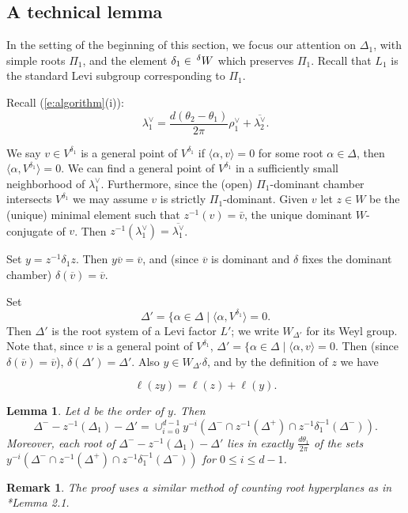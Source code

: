 \documentclass[10pt,leqno]{article}
\newtheorem{lemma}[equation]{Lemma}
\newtheorem{remark}[equation]{Remark}
{\theorembodyfont{\rmfamily}
\newtheorem{theoremplain}[equation]{Theorem}
\newtheorem{remarkplain}[equation]{Remark}
\newtheorem{editorialremarkplain}[equation]{Editorial Remark}
\newtheorem{exampleplain}[equation]{Example}
\newtheorem{corollaryplain}[equation]{Corollary}
}
\renewcommand{\a}{\mathfrak a}
\newcommand{\ch}[1]{#1^\vee}
\newcommand\inv{^{-1}}
\newcommand{\Wext}{\negthinspace\negthinspace\phantom{a}^\delta W}
\def\le{\leqslant}
\def\a{\alpha}
\def\d{\delta}
\def\th{\theta}
\def\l{\lambda}
\def\i{^{-1}}
\begin{document}

\subsection{A technical lemma}
\label{technical}

In the setting of the beginning of this section, we focus
our attention on $\Delta_1$, with simple roots $\Pi_1$,  and the element $\delta_1\in \Wext$
which preserves $\Pi_1$.
Recall that $L_1$ is the standard Levi subgroup corresponding to $\Pi_1$.

Recall (\ref{e:algorithm}(i)):
$$
\ch\l_1=\frac{d(\th_2-\th_1)}{2 \pi}
\ch\rho_1+\overline{\ch\l_2}.
$$

We say $v\in V^{\delta_1}$ is a general point of $V^{\delta_1}$ if $\langle\a, v\rangle=0$ for some
root $\a \in \Delta$, then $\langle\a, V^{\d_1}\rangle=0$.  We can
find a general point of $V^{\delta_1}$ in a sufficiently small
neighborhood of $\ch\l_{1}$.  Furthermore, since the (open)
$\Pi_1$-dominant chamber intersects $V^{\delta_1}$ we may assume $v$
is strictly $\Pi_1$-dominant.
Given $v$ let  $z \in W$ be the (unique) minimal element such
that $z\i(v) = \bar v$, the unique dominant $W$-conjugate of $v$.
Then $z\inv(\ch\l_{1})=\overline{\ch\l_{1}}$.

Set $y=z\inv\delta_1z$.  Then $y\overline v=\overline v$, and
(since $\overline v$ is dominant and $\delta$ fixes the dominant
chamber) $\delta(\overline v)=\overline v$.

Set
$$
\Delta'=\{\alpha\in\Delta\mid \langle\alpha,V^{\delta_1}\rangle=0.
$$
Then $\Delta'$ is the root system of a Levi factor $L'$; we write $W_{\Delta'}$ for its Weyl group.
Note that, since $v$ is a general point of $V^{\delta_1}$,  $\Delta'=\{\alpha\in\Delta\mid \langle\alpha,v\rangle=0$.
Then  (since $\delta(\overline v)=\overline v$), $\delta(\Delta')=\Delta'$. Also $y\in W_{\Delta'}\delta$,
and by the definition of $z$ we have

\begin{equation}
\label{e:lengthsadd}
\ell(zy)=\ell(z)+\ell(y).
\end{equation}

\begin{lemma} \label{tech}
Let $d$ be the order of $y$. Then
$$\Delta^- - z \i(\Delta_{1})-\Delta' = \cup_{i=0}^{d-1} y^{-i}(\Delta^- \cap z \i(\Delta^+) \cap z \i \d_1 \i(\Delta^-)).$$
Moreover, each root of $\Delta^- - z \i(\Delta_{1})-\Delta'$ lies in exactly $\frac{d \th_1} {2\pi}$ of the sets $y^{-i}(\Delta^- \cap z \i(\Delta^+) \cap z \i \d_1 \i(\Delta^-))$ for $0 \le i \le d-1$.
\end{lemma}
\begin{remark}
  The proof uses a similar method of counting root hyperplanes as in
  \cite{he_nie_minimal_finite}*{Lemma 2.1}.
\end{remark}
\end{document}
